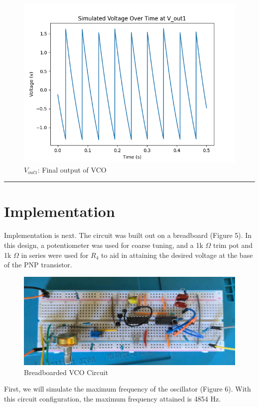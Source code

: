 \documentclass{article}
\begin{document}
\begin{figure}[H]
  \centering
  \includegraphics[width=.7\linewidth]{png/Vout1.png}
  \caption{$V_{out1}$: Final output of VCO}
\end{figure}

\vspace{5mm}
\hrule
  
\section*{\textcolor{mycolor}{Implementation}}
Implementation is next. The circuit was built out on a breadboard (Figure 5). In this design, a potentiometer was used for coarse tuning, and a 1k $\Omega$ trim pot and 1k $\Omega$ in series were used for $R_4$ to aid in attaining the desired voltage at the base of the PNP transistor.

\begin{figure}[H]
  \centering
  \includegraphics[width=.89\linewidth]{png/vco_breadboard.png}
  \caption{Breadboarded VCO Circuit}
\end{figure}

First, we will simulate the maximum frequency of the oscillator (Figure 6). With this circuit configuration, the maximum frequency attained is 4854 Hz.
\end{document}

